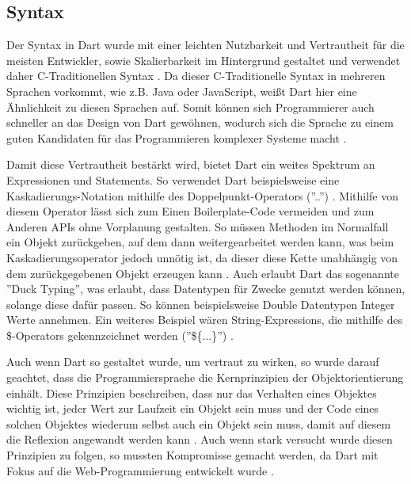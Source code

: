 \subsection{Syntax}
\label{subsec:Dart:Syntax}
Der Syntax in Dart wurde mit einer leichten Nutzbarkeit und Vertrautheit für die meisten Entwickler, sowie Skalierbarkeit im Hintergrund gestaltet und verwendet daher C-Traditionellen Syntax \cite{article:Dart:JavaAndDart_AfafMirghaniHassan, book:Dart:DPL_GiladBracha}.
Da dieser C-Traditionelle Syntax in mehreren Sprachen vorkommt, wie z.B. Java oder JavaScript, weißt Dart hier eine Ähnlichkeit zu diesen Sprachen auf. Somit können sich Programmierer auch schneller an das Design von Dart gewöhnen, wodurch sich die Sprache zu einem guten Kandidaten für das Programmieren komplexer Systeme macht \cite{article:Dart:JavaAndDart_AfafMirghaniHassan}.

\noindent
Damit diese Vertrautheit bestärkt wird, bietet Dart ein weites Spektrum an Expressionen und Statements. So verwendet Dart beispielsweise eine Kaskadierungs-Notation mithilfe des Doppelpunkt-Operators (''..'') \cite{article:Dart:JavaAndDart_AfafMirghaniHassan, book:Dart:DPL_GiladBracha}. Mithilfe von diesem Operator lässt sich zum Einen Boilerplate-Code vermeiden und zum Anderen APIs ohne Vorplanung gestalten. So müssen Methoden im Normalfall ein Objekt zurückgeben, auf dem dann weitergearbeitet werden kann, was beim Kaskadierungsoperator jedoch unnötig ist, da dieser diese Kette unabhängig von dem zurückgegebenen Objekt erzeugen kann \cite{book:Dart:DPL_GiladBracha}.
Auch erlaubt Dart das sogenannte ''Duck Typing'', was erlaubt, dass Datentypen für Zwecke genutzt werden können, solange diese dafür passen. So können beispielsweise Double Datentypen Integer Werte annehmen. Ein weiteres Beispiel wären String-Expressions, die mithilfe des \$-Operators gekennzeichnet werden (''\$\{...\}'') \cite{book:Dart:StartGuideDart_SanjibSinha}.

\noindent
Auch wenn Dart so gestaltet wurde, um vertraut zu wirken, so wurde darauf geachtet, dass die Programmiersprache die Kernprinzipien der Objektorientierung einhält. Diese Prinzipien beschreiben, dass nur das Verhalten eines Objektes wichtig ist, jeder Wert zur Laufzeit ein Objekt sein muss und der Code eines solchen Objektes wiederum selbst auch ein Objekt sein muss, damit auf diesem die Reflexion angewandt werden kann \cite{book:Dart:DPL_GiladBracha}.
Auch wenn stark versucht wurde diesen Prinzipien zu folgen, so mussten Kompromisse gemacht werden, da Dart mit Fokus auf die Web-Programmierung entwickelt wurde \cite{book:Dart:DPL_GiladBracha}.

